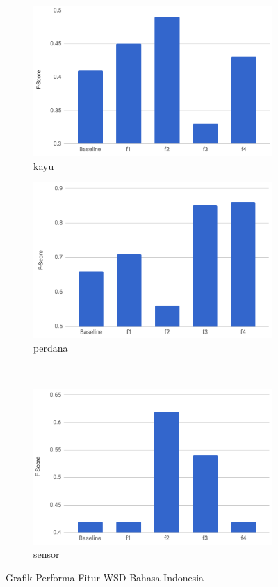 \begin{figure}[H]
	\ContinuedFloat
	\begin{subfigure}{.5\textwidth}
		\centering
		\includegraphics[width=1\linewidth]{adit_pics/kayu.png}
		\caption{kayu}
	\end{subfigure}%
	\begin{subfigure}{.5\textwidth}
		\centering
		\includegraphics[width=1\linewidth]{adit_pics/perdana.png}
		\caption{perdana}
	\end{subfigure}%
	\\
	\begin{subfigure}{.5\textwidth}
		\centering
		\includegraphics[width=1\linewidth]{adit_pics/sensor.png}
		\caption{sensor}
	\end{subfigure}%
	\caption{Grafik Performa Fitur WSD Bahasa Indonesia}
	\label{fig:fitur-wsd-indo}
\end{figure}
 

